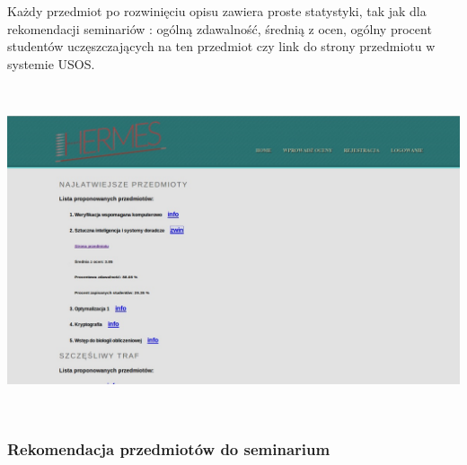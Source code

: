 \documentclass[licencjacka]{pracamgr}
\begin{document}
Każdy przedmiot po rozwinięciu opisu zawiera proste statystyki, tak jak dla rekomendacji seminariów : ogólną zdawalność, średnią z ocen, ogólny procent studentów uczęszczających na ten przedmiot czy link do strony przedmiotu w systemie USOS. \par
 ~\\
\begin{minipage}{\linewidth}
	\centering
           \includegraphics[scale=0.5]{rekPrzedmRankDetails.jpg}
\end{minipage} \\ 

\subsubsection{Rekomendacja przedmiotów do seminarium}
\end{document}
